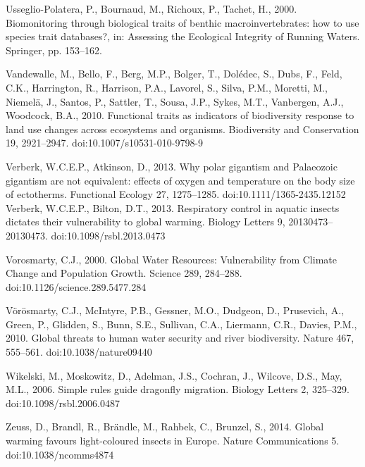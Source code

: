 \begin{thebibliography}
\bibitem{} \hangindent=1cm Usseglio-Polatera, P., Bournaud, M., Richoux, P., Tachet, H., 2000. Biomonitoring through biological traits of benthic macroinvertebrates: how to use species trait databases?, in: Assessing the Ecological Integrity of Running Waters. Springer, pp. 153–162.

\bibitem{} \hangindent=1cm Vandewalle, M., Bello, F., Berg, M.P., Bolger, T., Dolédec, S., Dubs, F., Feld, C.K., Harrington, R., Harrison, P.A., Lavorel, S., Silva, P.M., Moretti, M., Niemelä, J., Santos, P., Sattler, T., Sousa, J.P., Sykes, M.T., Vanbergen, A.J., Woodcock, B.A., 2010. Functional traits as indicators of biodiversity response to land use changes across ecosystems and organisms. Biodiversity and Conservation 19, 2921–2947. doi:10.1007/s10531-010-9798-9

\bibitem{} \hangindent=1cm Verberk, W.C.E.P., Atkinson, D., 2013. Why polar gigantism and Palaeozoic gigantism are not equivalent: effects of oxygen and temperature on the body size of ectotherms. Functional Ecology 27, 1275–1285. doi:10.1111/1365-2435.12152
Verberk, W.C.E.P., Bilton, D.T., 2013. Respiratory control in aquatic insects dictates their vulnerability to global warming. Biology Letters 9, 20130473–20130473. doi:10.1098/rsbl.2013.0473

\bibitem{} \hangindent=1cm Vorosmarty, C.J., 2000. Global Water Resources: Vulnerability from Climate Change and Population Growth. Science 289, 284–288. doi:10.1126/science.289.5477.284

\bibitem{} \hangindent=1cm Vörösmarty, C.J., McIntyre, P.B., Gessner, M.O., Dudgeon, D., Prusevich, A., Green, P., Glidden, S., Bunn, S.E., Sullivan, C.A., Liermann, C.R., Davies, P.M., 2010. Global threats to human water security and river biodiversity. Nature 467, 555–561. doi:10.1038/nature09440

\bibitem{} \hangindent=1cm Wikelski, M., Moskowitz, D., Adelman, J.S., Cochran, J., Wilcove, D.S., May, M.L., 2006. Simple rules guide dragonfly migration. Biology Letters 2, 325–329. doi:10.1098/rsbl.2006.0487

\bibitem{} \hangindent=1cm Zeuss, D., Brandl, R., Brändle, M., Rahbek, C., Brunzel, S., 2014. Global warming favours light-coloured insects in Europe. Nature Communications 5. doi:10.1038/ncomms4874

\end{thebibliography}

\endgroup

\openright